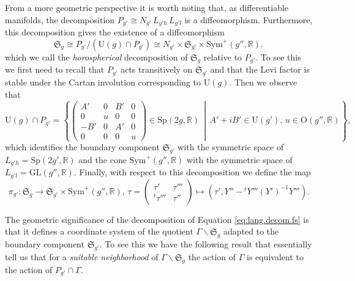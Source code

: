 \documentclass[11pt]{amsart}
\theoremstyle{plain}
\theoremstyle{definition}
\theoremstyle{remark}
\newcommand{\R}{\mathbb R}
\newcommand{\fS}{\mathfrak{S}}
\newcommand{\sym}{\mathrm{Sym}^{\!+}}
\newcommand{\Sp}{\mathrm{Sp}}
\begin{document}
From a more geometric perspective it is worth noting that, as differentiable manifolds, the decomposition $P_{g'}\cong N_{g'}\,L_{g'h}\,L_{g'l}$ is a diffeomorphism. Furthermore, this decomposition gives the existence of a diffeomorphism
\begin{equation}
    \label{eq:lang.decom.fs}
    \fS_g\cong P_{g'}/(\mathrm{U}(g)\cap P_{g'})\cong N_{g'}\times \fS_{g'}\times \sym(g'',\R),
\end{equation}
which we call the \emph{horospherical} decomposition of $\fS_g$ relative to $P_{g'}$. To see this we first need to recall that $P_{g'}$ acts transitively on $\fS_{g'}$ and that the Levi factor is stable under the Cartan involution corresponding to $\mathrm{U}(g)$. Then we observe that 
\[
    \mathrm{U}(g)\cap P_{g'}= \left\{ \begin{pmatrix}
                                            A'& 0 & B' & 0 \\
                                            0 & u & 0 & 0\\
                                            -B' & 0 & A' & 0 \\
                                            0 & 0 & 0 & u
                                        \end{pmatrix}
    \in \Sp(2g,\R)\, \middle|\, A'+iB' \in \mathrm{U}(g'),\, u \in \mathrm{O}(g'',\R) \right\},
\]
which identifies the boundary component $\fS_{g'}$ with the symmetric space of $L_{g'h}=\Sp(2g',\R)$ and the cone $\sym(g'',\R)$ with the symmetric space of $L_{g'l}=\mathrm{GL}(g'',\R)$. Finally, with respect to this decomposition we define the map 
\begin{equation}
    \label{eq:pi.gp.map}
    \pi_{g'}:\fS_g\to \fS_{g'}\!\times\sym(g'',\R), \,\tau =\!
\begin{pmatrix}
\tau' & \tau''' \\
^t\tau''' & \tau''
\end{pmatrix} \longmapsto (\tau',Y''-{}^tY'''(Y')^{-1}Y''').
\end{equation}

The geometric significance of the decomposition of Equation \eqref{eq:lang.decom.fs} is that it defines a coordinate system of the quotient $\Gamma \backslash \fS_g$ adapted to the boundary component $\fS_{g'}$. To see this we have the following result that essentially tell us that for a \textit{suitable neighborhood} of $\Gamma\backslash\fS_{g}$ the action of $\Gamma$ is equivalent to the action of $P_{g'}\cap\Gamma$.
\end{document}
